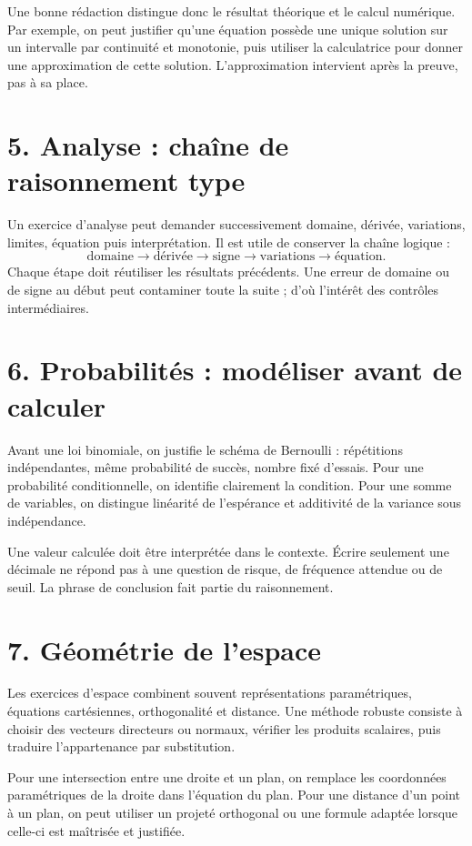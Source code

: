 Une bonne rédaction distingue donc le résultat théorique et le calcul numérique. Par exemple, on peut justifier qu’une équation possède une unique solution sur un intervalle par continuité et monotonie, puis utiliser la calculatrice pour donner une approximation de cette solution. L’approximation intervient après la preuve, pas à sa place.

\section{5. Analyse : chaîne de raisonnement type}
Un exercice d’analyse peut demander successivement domaine, dérivée, variations, limites, équation puis interprétation. Il est utile de conserver la chaîne logique :
\[
\text{domaine}\longrightarrow\text{dérivée}\longrightarrow\text{signe}\longrightarrow\text{variations}\longrightarrow\text{équation}.
\]
Chaque étape doit réutiliser les résultats précédents. Une erreur de domaine ou de signe au début peut contaminer toute la suite ; d’où l’intérêt des contrôles intermédiaires.

\section{6. Probabilités : modéliser avant de calculer}
Avant une loi binomiale, on justifie le schéma de Bernoulli : répétitions indépendantes, même probabilité de succès, nombre fixé d’essais. Pour une probabilité conditionnelle, on identifie clairement la condition. Pour une somme de variables, on distingue linéarité de l’espérance et additivité de la variance sous indépendance.

Une valeur calculée doit être interprétée dans le contexte. Écrire seulement une décimale ne répond pas à une question de risque, de fréquence attendue ou de seuil. La phrase de conclusion fait partie du raisonnement.

\section{7. Géométrie de l’espace}
Les exercices d’espace combinent souvent représentations paramétriques, équations cartésiennes, orthogonalité et distance. Une méthode robuste consiste à choisir des vecteurs directeurs ou normaux, vérifier les produits scalaires, puis traduire l’appartenance par substitution.

Pour une intersection entre une droite et un plan, on remplace les coordonnées paramétriques de la droite dans l’équation du plan. Pour une distance d’un point à un plan, on peut utiliser un projeté orthogonal ou une formule adaptée lorsque celle-ci est maîtrisée et justifiée.

